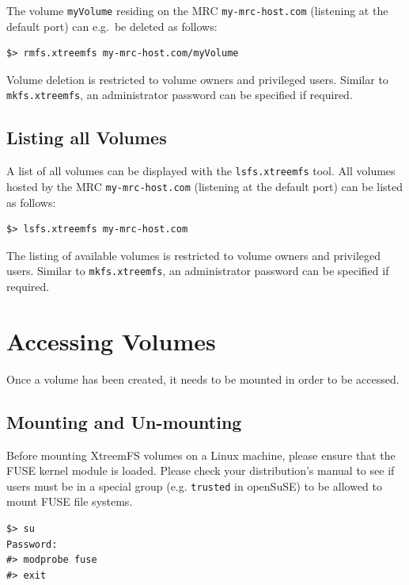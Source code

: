 \documentclass[a4paper,10pt]{book}
\begin{document}
The volume \texttt{myVolume} residing on the MRC \texttt{my-mrc-host.com} (listening at the default port) can e.g.\ be deleted as follows:

\begin{verbatim}
$> rmfs.xtreemfs my-mrc-host.com/myVolume
\end{verbatim}

Volume deletion is restricted to volume owners and privileged users. Similar to \texttt{mkfs.xtreemfs}, an administrator password can be specified if required.

\subsection{Listing all Volumes}

A list of all volumes can be displayed with the \texttt{lsfs.xtreemfs} tool. All volumes hosted by the MRC \texttt{my-mrc-host.com} (listening at the default port) can be listed as follows:

\begin{verbatim}
$> lsfs.xtreemfs my-mrc-host.com
\end{verbatim}

The listing of available volumes is restricted to volume owners and privileged users. Similar to \texttt{mkfs.xtreemfs}, an administrator password can be specified if required.

\section{Accessing Volumes}
\label{sec:mount_vol}

Once a volume has been created, it needs to be mounted in order to be accessed.

\subsection{Mounting and Un-mounting}

Before mounting XtreemFS volumes on a Linux machine, please ensure that the FUSE kernel module is loaded. Please check your distribution's manual to see if users must be in a special group (e.g. \texttt{trusted} in openSuSE) to be allowed to mount FUSE file systems.


\begin{verbatim}
$> su
Password:
#> modprobe fuse
#> exit
\end{verbatim}
\end{document}
